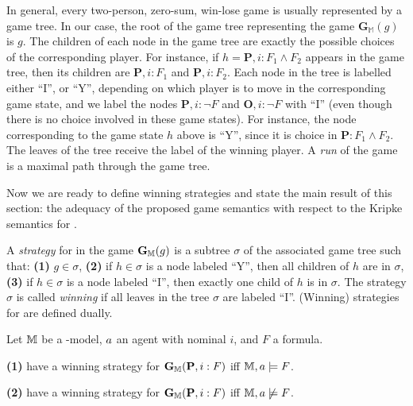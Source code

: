 In general, every two-person, zero-sum, win-lose game is usually represented by
a game tree. In our
case, the root of the game tree representing the game
$\mathbf{G}_\mathbb{M}(g)$ is $g$. The children of each node in the game tree
are exactly the possible choices of the corresponding player. For instance, if
$h=\mathbf{P},  i :  F _1\wedge  F _2$ appears in the game tree, then its
children are $\mathbf{P}, i : F _1$ and $\mathbf{P}, i : F _2$. Each node in
the tree is labelled either ``I'', or ``Y'', depending on which player is to
move in the corresponding game state, and we label 
the nodes  $\mathbf{P},  i : \neg  F $ and $\mathbf{O},  i :
\neg  F $ with ``I'' (even though there is no choice involved in these game
states). For instance, the node corresponding to the game state $h$ above is
``Y'', since it is \Your choice in $\mathbf{P}: F _1\wedge  F _2$. The leaves
of the tree receive the label of the winning player. 
A \emph{run} of the game is a maximal path through the game tree.

Now we are ready to define winning strategies and state the main result of this section:
the adequacy of the proposed game semantics with respect to the Kripke semantics for \PNL.

\begin{definition}
    A \emph{strategy} for \Me in the game $\mathbf{G}_{\mathbb{M}}(g)$ is a subtree $\sigma$ of the associated game tree such that: 
 \textbf{(1)} $g\in \sigma$,
 \textbf{(2)} if $h\in \sigma$ is a node labeled ``Y'', then all children of $h$ are in $\sigma$,
 \textbf{(3)} if $h\in \sigma$ is a node labeled ``I'', then exactly one child of $h$ is in $\sigma$.
The strategy $\sigma$ is called \emph{winning} if all leaves in the tree $\sigma$ are labeled ``I''. (Winning) strategies for \You are defined dually.
\end{definition}

\begin{theorem}%
\label{th:adequacy}
Let $\mathbb{M}$ be a \PNL-model, $\ag$ an agent with nominal $i$, and $F$ a formula.

\noindent\textbf{(1)} \Ic have a winning strategy for $\mathbf{G}_{\mathbb{M}}(\mathbf{P}, i:F)$ iff $\M,\ag \models F$. 

\noindent\textbf{(2)} \You have a winning strategy for $\mathbf{G}_{\mathbb{M}}(\mathbf{P}, i:F)$ iff $\M,\ag\not \models F$.
\end{theorem}

